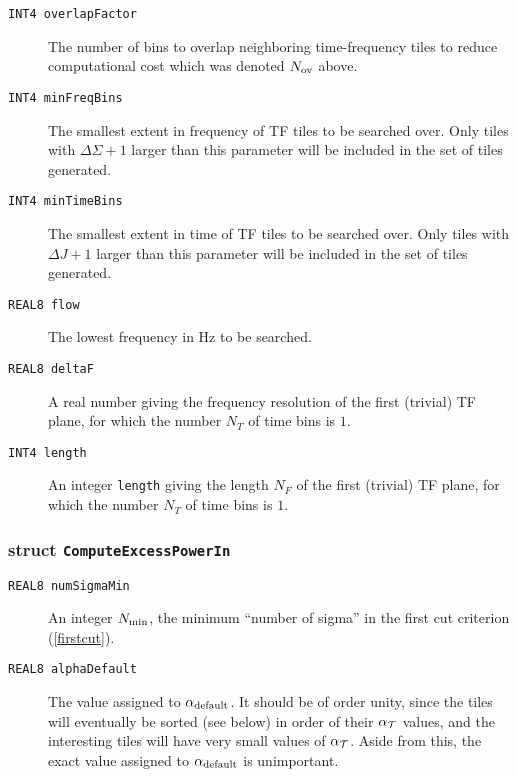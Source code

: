\begin{description}
\item[\texttt{INT4 overlapFactor}] The number of bins to overlap neighboring
time-frequency tiles to reduce computational cost which was denoted $N_{\rm
ov}$ above.

\item[\texttt{INT4 minFreqBins}] The smallest extent in frequency of TF tiles
to be searched over.  Only tiles with $\Delta \Sigma +1$ larger than this
parameter will be included in the set of tiles generated.

\item[\texttt{INT4 minTimeBins}] The smallest extent in time of TF tiles
to be searched over.  Only tiles with $\Delta J +1$ larger than this
parameter will be included in the set of tiles generated.

\item[\texttt{REAL8 flow}] The lowest frequency in Hz to be searched.

\item[\texttt{REAL8 deltaF}] A real number giving the frequency resolution of
the first (trivial) TF plane, for which the number $N_T$ of time bins is $1$.

\item[\texttt{INT4 length}] An integer \verb+length+ giving the length $N_F$
of the first (trivial) TF plane, for which the number $N_T$ of time bins is
$1$.
\end{description}

\subsubsection*{struct \texttt{ComputeExcessPowerIn}}

\begin{description}
\item[\texttt{REAL8 numSigmaMin}] An integer $N_{\rm min}$,
the minimum ``number of sigma'' in the first cut criterion
(\ref{firstcut}). 

\item[\texttt{REAL8 alphaDefault}] The value assigned to $\alpha_{\rm
default}$. It should be of order unity, since the tiles will eventually be
sorted (see below) in order of their $\alpha_{\cal T}$ values, and the
interesting tiles will have very small values of $\alpha_{\cal T}$.  Aside
from this, the exact value assigned to $\alpha_{\rm default}$  is unimportant.  
\end{description}

